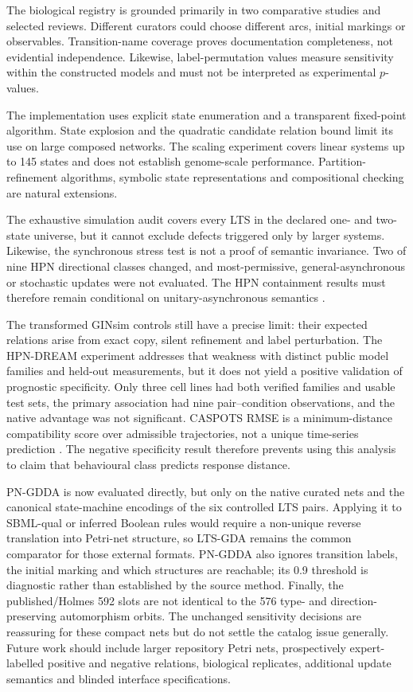 \documentclass[pdflatex,sn-mathphys-ay]{sn-jnl}
\theoremstyle{definition}
\begin{document}
The biological registry is grounded primarily in two comparative studies and
selected reviews. Different curators could choose different arcs, initial
markings or observables. Transition-name coverage proves documentation
completeness, not evidential independence. Likewise, label-permutation values
measure sensitivity within the constructed models and must not be interpreted as
experimental $p$-values.

The implementation uses explicit state enumeration and a transparent fixed-point
algorithm. State explosion and the quadratic candidate relation bound limit its
use on large composed networks. The scaling experiment covers linear systems up
to 145 states and does not establish genome-scale performance. Partition-
refinement algorithms, symbolic state representations and compositional checking
are natural extensions.

The exhaustive simulation audit covers every LTS in the declared one- and
two-state universe, but it cannot exclude defects triggered only by larger
systems. Likewise, the synchronous stress test is not a proof of semantic
invariance. Two of nine HPN directional classes changed, and most-permissive,
general-asynchronous or stochastic updates were not evaluated. The HPN
containment results must therefore remain conditional on unitary-asynchronous
semantics \citep{Pauleve2020}.

The transformed GINsim controls still have a precise limit: their expected
relations arise from exact copy, silent refinement and label perturbation. The
HPN-DREAM experiment addresses that weakness with distinct public model families
and held-out measurements, but it does not yield a positive validation of
prognostic specificity. Only three cell lines had both verified families and
usable test sets, the primary association had nine pair--condition observations,
and the native advantage was not significant. CASPOTS RMSE is a minimum-distance
compatibility score over admissible trajectories, not a unique time-series
prediction \citep{Razzaq2018}. The negative specificity result therefore prevents
using this analysis to claim that behavioural class predicts response distance.

PN-GDDA is now evaluated directly, but only on the native curated nets and the
canonical state-machine encodings of the six controlled LTS pairs. Applying it
to SBML-qual or inferred Boolean rules would require a non-unique reverse
translation into Petri-net structure, so LTS-GDA remains the common comparator
for those external formats. PN-GDDA also ignores transition labels, the initial
marking and which structures are reachable; its 0.9 threshold is diagnostic
rather than established by the source method. Finally, the published/Holmes 592
slots are not identical to the 576 type- and direction-preserving automorphism
orbits. The unchanged sensitivity decisions are reassuring for these compact
nets but do not settle the catalog issue generally. Future work should include
larger repository Petri nets, prospectively expert-labelled positive and
negative relations, biological replicates, additional update semantics and
blinded interface specifications.
\end{document}
